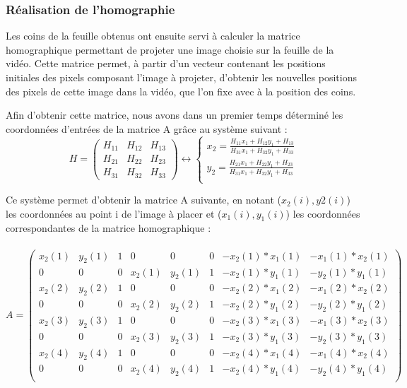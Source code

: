 \documentclass[blue]{ceri/sty/rapport}
\begin{document}
\subsubsection{Réalisation de l'homographie}

Les coins de la feuille obtenus ont ensuite servi à calculer la matrice homographique permettant de projeter une image choisie sur la feuille de la vidéo. Cette matrice permet, à partir d'un vecteur contenant les positions initiales des pixels composant l'image à projeter, d'obtenir les nouvelles positions des pixels de cette image dans la vidéo, que l'on fixe avec à la position des coins. 

Afin d'obtenir cette matrice, nous avons dans un premier temps déterminé les coordonnées d'entrées de la matrice A grâce au système suivant :
\[
H = \begin{pmatrix}H_{11}&H_{12}&H_{13}\\
H_{21}&H_{22}&H_{23}\\
H_{31}&H_{32}&H_{33}
\end{pmatrix}  
\longleftrightarrow
\left \{ 
\begin{array}{cc}
 x_2= \frac{H_{11}x_1 + H_{12}y_1 + H_{13}}{H_{31}x_1 + H_{32}y_1 + H_{33}}  \\
 y_2= \frac{H_{21}x_1 + H_{22}y_1 + H_{23}}{H_{31}x_1 + H_{32}y_1 + H_{33}}  \\
\end{array}
\right .  
\]

Ce système permet d'obtenir la matrice A suivante, en notant ($x_2(i),y2(i)$) les coordonnées au point i de l'image à placer et ($x_1(i),y_1(i)$) les coordonnées correspondantes de la matrice homographique : \\
\\

$A = \begin{pmatrix}x_2(1)&y_2(1)&1&0&0&0&-x_2(1)*x_1(1)&-x_1(1)*x_2(1)\\ 
0&0&0&x_2(1)&y_2(1)&1&-x_2(1)*y_1(1)&-y_2(1)*y_1(1)\\ 
x_2(2)&y_2(2)&1&0&0&0&-x_2(2)*x_1(2)&-x_1(2)*x_2(2)\\ 
0&0&0&x_2(2)&y_2(2)&1&-x_2(2)*y_1(2)&-y_2(2)*y_1(2)\\ 
x_2(3)&y_2(3)&1&0&0&0&-x_2(3)*x_1(3)&-x_1(3)*x_2(3)\\ 
0&0&0&x_2(3)&y_2(3)&1&-x_2(3)*y_1(3)&-y_2(3)*y_1(3)\\ 
x_2(4)&y_2(4)&1&0&0&0&-x_2(4)*x_1(4)&-x_1(4)*x_2(4)\\ 
0&0&0&x_2(4)&y_2(4)&1&-x_2(4)*y_1(4)&-y_2(4)*y_1(4)\\ 
\end{pmatrix} $
\end{document}
